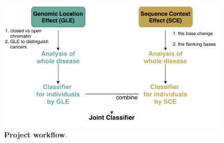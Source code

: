\begin{figure}[h!]
    \centering
    \includegraphics[scale=0.9]{graphics/workflow.pdf}
    \caption{\textbf{Project workflow}. }
    \label{fig:workflow}
\end{figure}

